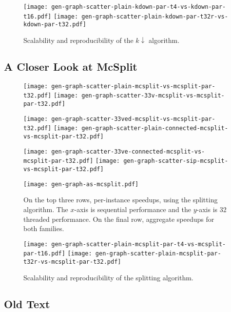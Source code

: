 \documentclass[sigconf]{acmart}
\begin{document}
\begin{figure}[tb]
    \texttt{[image: gen-graph-scatter-plain-kdown-par-t4-vs-kdown-par-t16.pdf]}
    \hfill
    \texttt{[image: gen-graph-scatter-plain-kdown-par-t32r-vs-kdown-par-t32.pdf]}

    \caption{Scalability and reproducibility of the $k{\downarrow}$ algorithm.}
\end{figure}

\subsection{A Closer Look at McSplit}

\begin{figure}[tb]
    \texttt{[image: gen-graph-scatter-plain-mcsplit-vs-mcsplit-par-t32.pdf]}
    \hfill
    \texttt{[image: gen-graph-scatter-33v-mcsplit-vs-mcsplit-par-t32.pdf]}

    \vspace*{1em}

    \texttt{[image: gen-graph-scatter-33ved-mcsplit-vs-mcsplit-par-t32.pdf]}
    \hfill
    \texttt{[image: gen-graph-scatter-plain-connected-mcsplit-vs-mcsplit-par-t32.pdf]}

    \vspace*{1em}

    \texttt{[image: gen-graph-scatter-33ve-connected-mcsplit-vs-mcsplit-par-t32.pdf]}
    \hfill
    \texttt{[image: gen-graph-scatter-sip-mcsplit-vs-mcsplit-par-t32.pdf]}

    \vspace*{1em}

    \texttt{[image: gen-graph-as-mcsplit.pdf]}

    \caption{On the top three rows, per-instance speedups, using the splitting algorithm. The
    $x$-axis is sequential performance and the $y$-axis is 32 threaded performance. On the final
    row, aggregate speedups for both families.}
\end{figure}

\begin{figure}[tb]
    \texttt{[image: gen-graph-scatter-plain-mcsplit-par-t4-vs-mcsplit-par-t16.pdf]}
    \hfill
    \texttt{[image: gen-graph-scatter-plain-mcsplit-par-t32r-vs-mcsplit-par-t32.pdf]}

    \caption{Scalability and reproducibility of the splitting algorithm.}
\end{figure}

\subsection{Old Text}
\end{document}
